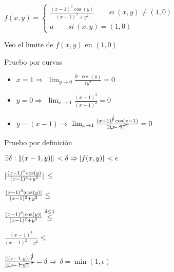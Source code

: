 \documentclass[../practica_03.tex]{subfiles}
\begin{document}
    $f(x,y) = \left\{
        \begin{array}{ll}
            \frac{(x-1)^3\cos(y)}{(x-1)^2 +y^2} \qquad si\ (x,y)\neq(1,0)\\
            a \qquad si\ (x,y) = (1,0)
        \end{array}
    \right.$

    Veo el limite de $f(x,y)$ en $(1,0)$ 

    Pruebo por curvas

    \begin{itemize} %
        \item $x = 1 \Rightarrow$
            $ \lim_{y \to 0} \frac{0\cdot\cos(y)}{(y^2} = 0$
        \item $y = 0 \Rightarrow$
            $ \lim_{x \to 1} \frac{(x-1)^3}{(x-1)^2} = 0$
        \item $y = (x-1) \Rightarrow$
            $ \lim_{x \to 1} \frac{(x-1)^{\cancel{3}}\cos(x-1)}{2\cancel{(x-1)^2}} = 0$
    \end{itemize}

    Pruebo por definición

    $ \exists \delta : \norm*{(x-1,y)} < \delta \Rightarrow \abs*{f(x,y)} < \epsilon $

    $\abs*{\frac{(x-1)^3\cos(y)}{(x-1)^2 +y^2}} \leq$

    $\frac{(x-1)^3\abs*{\cos(y)}}{(x-1)^2 +y^2} \leq$

    $\frac{(x-1)^3\abs*{\cos(y)}}{(x-1)^2 +y^2} \stackrel{\delta \leq 1}{\leq}$

    $\frac{(x-1)^3}{(x-1)^2 +y^2} \leq$

    $\frac{\norm*{(x-1,y)}^{\cancel{3}}}{\cancel{\norm*{(x-1,y)}^2}} = \delta \Rightarrow $
    $\delta = \min(1, \epsilon)$
\end{document}

